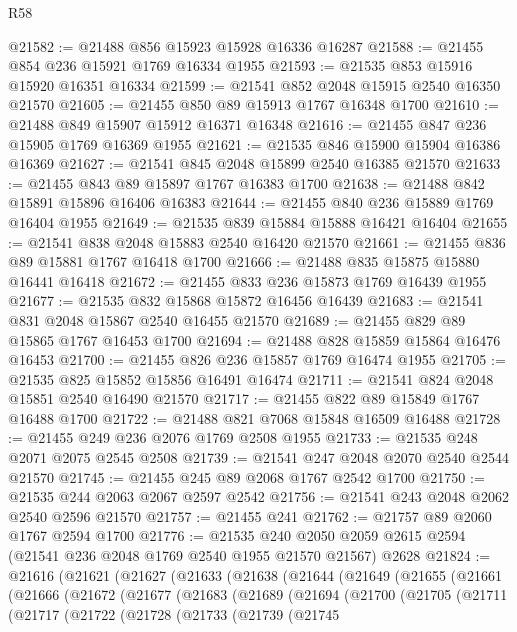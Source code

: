 \begin{lexlean}{R58}
\begin{coremodule}
@21582 := @21488 @856 @15923 @15928 @16336 @16287
@21588 := @21455 @854 @236 @15921 @1769 @16334 @1955
@21593 := @21535 @853 @15916 @15920 @16351 @16334
@21599 := @21541 @852 @2048 @15915 @2540 @16350 @21570
@21605 := @21455 @850 @89 @15913 @1767 @16348 @1700
@21610 := @21488 @849 @15907 @15912 @16371 @16348
@21616 := @21455 @847 @236 @15905 @1769 @16369 @1955
@21621 := @21535 @846 @15900 @15904 @16386 @16369
@21627 := @21541 @845 @2048 @15899 @2540 @16385 @21570
@21633 := @21455 @843 @89 @15897 @1767 @16383 @1700
@21638 := @21488 @842 @15891 @15896 @16406 @16383
@21644 := @21455 @840 @236 @15889 @1769 @16404 @1955
@21649 := @21535 @839 @15884 @15888 @16421 @16404
@21655 := @21541 @838 @2048 @15883 @2540 @16420 @21570
@21661 := @21455 @836 @89 @15881 @1767 @16418 @1700
@21666 := @21488 @835 @15875 @15880 @16441 @16418
@21672 := @21455 @833 @236 @15873 @1769 @16439 @1955
@21677 := @21535 @832 @15868 @15872 @16456 @16439
@21683 := @21541 @831 @2048 @15867 @2540 @16455 @21570
@21689 := @21455 @829 @89 @15865 @1767 @16453 @1700
@21694 := @21488 @828 @15859 @15864 @16476 @16453
@21700 := @21455 @826 @236 @15857 @1769 @16474 @1955
@21705 := @21535 @825 @15852 @15856 @16491 @16474
@21711 := @21541 @824 @2048 @15851 @2540 @16490 @21570
@21717 := @21455 @822 @89 @15849 @1767 @16488 @1700
@21722 := @21488 @821 @7068 @15848 @16509 @16488
@21728 := @21455 @249 @236 @2076 @1769 @2508 @1955
@21733 := @21535 @248 @2071 @2075 @2545 @2508
@21739 := @21541 @247 @2048 @2070 @2540 @2544 @21570
@21745 := @21455 @245 @89 @2068 @1767 @2542 @1700
@21750 := @21535 @244 @2063 @2067 @2597 @2542
@21756 := @21541 @243 @2048 @2062 @2540 @2596 @21570
@21757 := @21455 @241
@21762 := @21757 @89 @2060 @1767 @2594 @1700
@21776 := @21535
    @240
    @2050
    @2059
    @2615
    @2594
    (@21541 @236 @2048 @1769 @2540 @1955 @21570 @21567)
    @2628
@21824 := @21616
    (@21621
      (@21627
        (@21633
          (@21638
            (@21644
              (@21649
                (@21655
                  (@21661
                    (@21666
                      (@21672
                        (@21677
                          (@21683
                            (@21689
                              (@21694
                                (@21700
                                  (@21705
                                    (@21711
                                      (@21717
                                        (@21722
                                          (@21728
                                            (@21733
                                              (@21739
                                                (@21745

\end{coremodule}
\end{lexlean}
